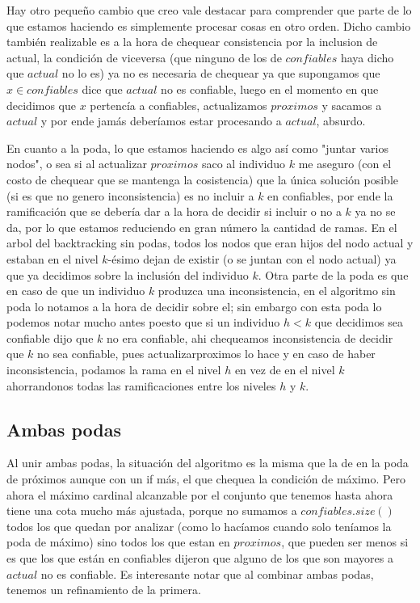 \documentclass[A4paper,oneside,fleqn,10pt]{article}
\theoremstyle{definition}
\begin{document}
Hay otro pequeño cambio que creo vale destacar para comprender que parte de lo que estamos haciendo es simplemente procesar cosas en otro orden. Dicho cambio también realizable es a la hora de chequear consistencia por la inclusion de actual, la condición de viceversa (que ninguno de los de $confiables$ haya dicho que $actual$ no lo es) ya no es necesaria de chequear ya que supongamos que $x \in confiables$ dice que $actual$ no es confiable, luego en el momento en que decidimos que $x$ pertencía a confiables, actualizamos $proximos$ y sacamos a $actual$ y por ende jamás deberíamos estar procesando a $actual$, absurdo. 

En cuanto a la poda, lo que estamos haciendo es algo así como "juntar varios nodos", o sea si al actualizar $proximos$ saco al individuo $k$ me aseguro (con el costo de chequear que se mantenga la cosistencia) que la única solución posible (si es que no genero inconsistencia) es no incluir a $k$ en confiables, por ende la ramificación que se debería dar a la hora de decidir si incluir o no a $k$ ya no se da, por lo que estamos reduciendo en gran número la cantidad de ramas. 
En el arbol del backtracking sin podas, todos los nodos que eran hijos del nodo actual y estaban en el nivel $k$-ésimo dejan de existir (o se juntan con el nodo actual) ya que ya decidimos sobre la inclusión del individuo $k$. Otra parte de la poda es que en caso de que un individuo $k$ produzca una inconsistencia, en el algoritmo sin poda lo notamos a la hora de decidir sobre el; sin embargo con esta poda lo podemos notar mucho antes poesto que si un individuo $h<k$ que decidimos sea confiable dijo que $k$ no era confiable, ahi chequeamos inconsistencia de decidir que $k$ no sea confiable, pues actualizarproximos lo hace y en caso de haber inconsistencia, podamos la rama en el nivel $h$ en vez de en el nivel $k$ ahorrandonos todas las ramificaciones entre los niveles $h$ y $k$.

\subsection{Ambas podas}
Al unir ambas podas, la situación del algoritmo es la misma que la de en la poda de próximos aunque con un if más, el que chequea la condición de máximo. Pero ahora el máximo cardinal alcanzable por el conjunto que tenemos hasta ahora tiene una cota mucho más ajustada, porque no sumamos a $confiables.size()$ todos los que quedan por analizar (como lo hacíamos cuando solo teníamos la poda de máximo) sino todos los que estan en $proximos$, que pueden ser menos si es que los que están en confiables dijeron que alguno de los que son mayores a $actual$ no es confiable. Es interesante notar que al combinar ambas podas, tenemos un refinamiento de la primera.
\end{document}
